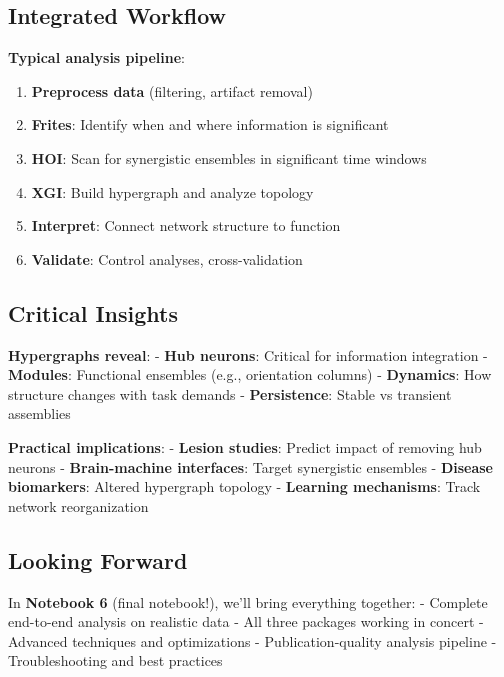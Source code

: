 \documentclass[
  11pt,
  letterpaper,
  oneside,
  openany]{book}
\providecommand{\tightlist}{%
  \setlength{\itemsep}{0pt}\setlength{\parskip}{0pt}}
\begin{document}
\subsection{Integrated Workflow}\label{integrated-workflow}

\textbf{Typical analysis pipeline}:

\begin{enumerate}
\def\labelenumi{\arabic{enumi}.}
\tightlist
\item
  \textbf{Preprocess data} (filtering, artifact removal)
\item
  \textbf{Frites}: Identify when and where information is significant
\item
  \textbf{HOI}: Scan for synergistic ensembles in significant time
  windows
\item
  \textbf{XGI}: Build hypergraph and analyze topology
\item
  \textbf{Interpret}: Connect network structure to function
\item
  \textbf{Validate}: Control analyses, cross-validation
\end{enumerate}

\subsection{Critical Insights}\label{critical-insights}

\textbf{Hypergraphs reveal}: - \textbf{Hub neurons}: Critical for
information integration - \textbf{Modules}: Functional ensembles (e.g.,
orientation columns) - \textbf{Dynamics}: How structure changes with
task demands - \textbf{Persistence}: Stable vs transient assemblies

\textbf{Practical implications}: - \textbf{Lesion studies}: Predict
impact of removing hub neurons - \textbf{Brain-machine interfaces}:
Target synergistic ensembles - \textbf{Disease biomarkers}: Altered
hypergraph topology - \textbf{Learning mechanisms}: Track network
reorganization

\subsection{Looking Forward}\label{looking-forward}

In \textbf{Notebook 6} (final notebook!), we'll bring everything
together: - Complete end-to-end analysis on realistic data - All three
packages working in concert - Advanced techniques and optimizations -
Publication-quality analysis pipeline - Troubleshooting and best
practices
\end{document}
